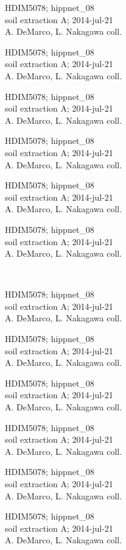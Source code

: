 \documentclass[2pt]{extarticle}
\begin{document}
\noindent
\parbox{0.16\textwidth}{\tiny \raggedright \rule[-0.3\baselineskip]{0pt}{10pt}HDIM5078; hippnet\_08\\ soil extraction A; 2014-jul-21\\ A. DeMarco, L. Nakagawa coll.}
\parbox{0.16\textwidth}{\tiny \raggedright \rule[-0.3\baselineskip]{0pt}{10pt}HDIM5078; hippnet\_08\\ soil extraction A; 2014-jul-21\\ A. DeMarco, L. Nakagawa coll.}
\parbox{0.16\textwidth}{\tiny \raggedright \rule[-0.3\baselineskip]{0pt}{10pt}HDIM5078; hippnet\_08\\ soil extraction A; 2014-jul-21\\ A. DeMarco, L. Nakagawa coll.}
\parbox{0.16\textwidth}{\tiny \raggedright \rule[-0.3\baselineskip]{0pt}{10pt}HDIM5078; hippnet\_08\\ soil extraction A; 2014-jul-21\\ A. DeMarco, L. Nakagawa coll.}
\parbox{0.16\textwidth}{\tiny \raggedright \rule[-0.3\baselineskip]{0pt}{10pt}HDIM5078; hippnet\_08\\ soil extraction A; 2014-jul-21\\ A. DeMarco, L. Nakagawa coll.}
\parbox{0.16\textwidth}{\tiny \raggedright \rule[-0.3\baselineskip]{0pt}{10pt}HDIM5078; hippnet\_08\\ soil extraction A; 2014-jul-21\\ A. DeMarco, L. Nakagawa coll.} \\ 
\vspace{0.001in} 

\noindent
\parbox{0.16\textwidth}{\tiny \raggedright \rule[-0.3\baselineskip]{0pt}{10pt}HDIM5078; hippnet\_08\\ soil extraction A; 2014-jul-21\\ A. DeMarco, L. Nakagawa coll.}
\parbox{0.16\textwidth}{\tiny \raggedright \rule[-0.3\baselineskip]{0pt}{10pt}HDIM5078; hippnet\_08\\ soil extraction A; 2014-jul-21\\ A. DeMarco, L. Nakagawa coll.}
\parbox{0.16\textwidth}{\tiny \raggedright \rule[-0.3\baselineskip]{0pt}{10pt}HDIM5078; hippnet\_08\\ soil extraction A; 2014-jul-21\\ A. DeMarco, L. Nakagawa coll.}
\parbox{0.16\textwidth}{\tiny \raggedright \rule[-0.3\baselineskip]{0pt}{10pt}HDIM5078; hippnet\_08\\ soil extraction A; 2014-jul-21\\ A. DeMarco, L. Nakagawa coll.}
\parbox{0.16\textwidth}{\tiny \raggedright \rule[-0.3\baselineskip]{0pt}{10pt}HDIM5078; hippnet\_08\\ soil extraction A; 2014-jul-21\\ A. DeMarco, L. Nakagawa coll.}
\parbox{0.16\textwidth}{\tiny \raggedright \rule[-0.3\baselineskip]{0pt}{10pt}HDIM5078; hippnet\_08\\ soil extraction A; 2014-jul-21\\ A. DeMarco, L. Nakagawa coll.} \\ 
\vspace{0.001in} 
\end{document}
